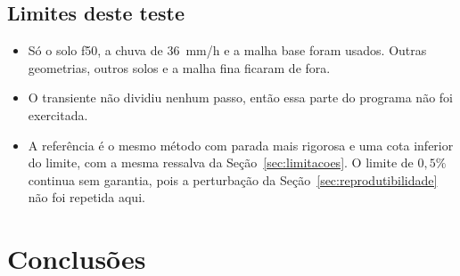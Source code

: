 \documentclass[11pt,a4paper]{article}
\numberwithin{equation}{section}
\begin{document}
\subsection{Limites deste teste}

\begin{itemize}
\item Só o solo f50, a chuva de 36~mm/h e a malha base foram usados. Outras geometrias, outros solos e a malha fina ficaram de fora.
\item O transiente não dividiu nenhum passo, então essa parte do programa não foi exercitada.
\item A referência é o mesmo método com parada mais rigorosa e uma cota inferior do limite, com a mesma ressalva da Seção~\ref{sec:limitacoes}. O limite de $0{,}5\%$ continua sem garantia, pois a perturbação da Seção~\ref{sec:reprodutibilidade} não foi repetida aqui.
\end{itemize}


\section{Conclusões}\label{sec:conclusoes}
\end{document}
